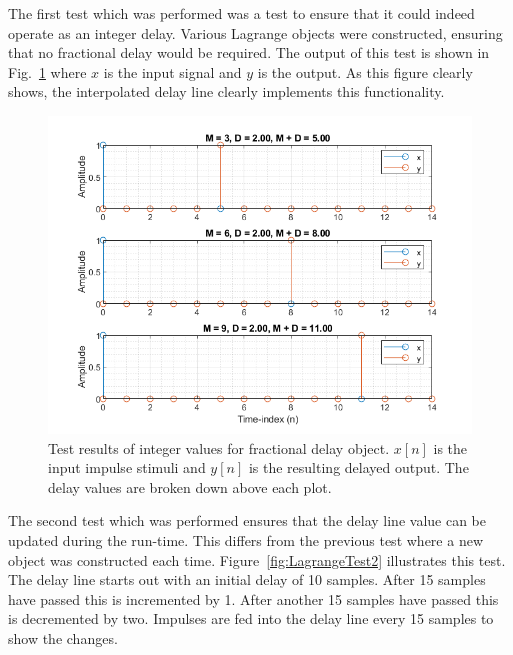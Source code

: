 \documentclass[../main.tex]{subfiles}
\begin{document}
The first test which was performed was a test to ensure that it could indeed operate as an integer delay. Various Lagrange objects were constructed, ensuring that no fractional delay would be required. The output of this test is shown in Fig.~\ref{fig:LagrangeTest1} where $x$ is the input signal and $y$ is the output. As this figure clearly shows, the interpolated delay line clearly implements this functionality.

\begin{figure}[h]
    \centering
    \includegraphics[scale=.65]{./images/plots/LagrangeTest1.png}
    \caption{Test results of integer values for fractional delay object. $x[n]$ is the input impulse stimuli and $y[n]$ is the resulting delayed output. The delay values are broken down above each plot.}
    \label{fig:LagrangeTest1}
\end{figure}

The second test which was performed ensures that the delay line value can be updated during the run-time. This differs from the previous test where a new object was constructed each time. Figure~\ref{fig:LagrangeTest2} illustrates this test. The delay line starts out with an initial delay of 10 samples. After 15 samples have passed this is incremented by 1. After another 15 samples have passed this is decremented by two. Impulses are fed into the delay line every 15 samples to show the changes.
\end{document}
